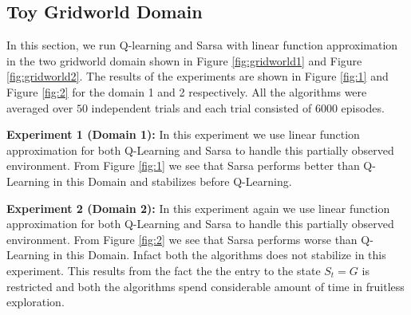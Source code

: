 \subsection{Toy Gridworld Domain}

In this section, we run Q-learning and Sarsa with linear function approximation in the two gridworld domain shown in Figure \ref{fig:gridworld1} and Figure \ref{fig:gridworld2}. The results of the experiments are shown in Figure \ref{fig:1} and Figure \ref{fig:2} for the domain 1 and 2 respectively. All the algorithms were averaged over $50$ independent trials and each trial consisted of $6000$ episodes.

\textbf{Experiment 1 (Domain 1):} In this experiment we use linear function approximation for both Q-Learning and Sarsa to handle this partially observed environment. From Figure \ref{fig:1} we see that Sarsa performs better than Q-Learning in this Domain and stabilizes before Q-Learning.

\textbf{Experiment 2 (Domain 2):} In this experiment again we use linear function approximation for both Q-Learning and Sarsa to handle this partially observed environment. From Figure \ref{fig:2} we see that Sarsa performs worse than Q-Learning in this Domain. Infact both the algorithms does not stabilize in this experiment. This results from the fact the the entry to the state $S_t = G$ is restricted and both the algorithms spend considerable amount of time in fruitless exploration.



